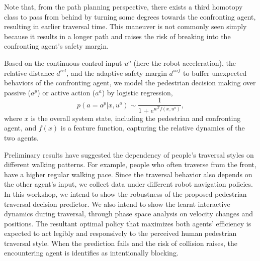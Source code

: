 \documentclass[conference]{IEEEtran}
\begin{document}
Note that, from the path planning perspective, there exists a third homotopy class to pass from behind by turning some degrees towards the confronting agent, resulting in earlier traversal time. This maneuver is not commonly seen simply because it results in a longer path and raises the risk of breaking into the confronting agent's safety margin. 

Based on the continuous control input $u^o$ (here the robot acceleration), the 
relative distance $d^{rel}$, and the adaptive safety margin $d^{saf}$ to 
buffer unexpected behaviors of the confronting agent, we model the pedestrian 
decision making over passive ($a^p$) or active action ($a^a$) by logistic regression,
\begin{equation}
p(a=a^p|x,u^o) \sim \frac{1}{1+e^{w^Tf(x,u^o)}}, 
\end{equation}
where $x$ is the overall system state, including the pedestrian and confronting agent, and $f(x)$ is a feature function, capturing the relative dynamics of the two agents.

Preliminary results have suggested the dependency of people's traversal styles 
on different walking patterns. For example, people who often traverse from 
the front, have a higher regular walking pace. Since the traversal 
behavior also depends on the other agent's input, we collect data under 
different robot navigation policies. In this workshop, we intend to show the 
robustness of the proposed pedestrian traversal decision predictor. We also 
intend to show the learnt interactive dynamics during traversal, through phase 
space analysis on velocity changes and positions. The resultant optimal 
policy that maximizes both agents' efficiency is expected to act legibly 
and responsively to the perceived human pedestrian traversal style. When the 
prediction fails and the risk of collision raises, the encountering agent is 
identifies as intentionally blocking.

{\footnotesize


}
\end{document}
